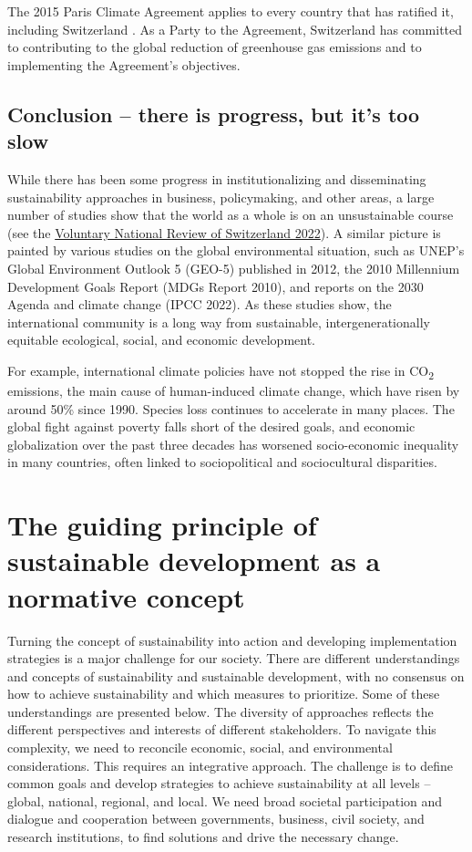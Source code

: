 \documentclass[
  a4paper,
  openany]{book}
\begin{document}
The 2015 Paris Climate Agreement applies to every country that has
ratified it, including Switzerland . As a Party to the Agreement,
Switzerland has committed to contributing to the global reduction of
greenhouse gas emissions and to implementing the Agreement's objectives.

\subsection{Conclusion -- there is progress, but it's too
slow}\label{conclusion-there-is-progress-but-its-too-slow}

While there has been some progress in institutionalizing and
disseminating sustainability approaches in business, policymaking, and
other areas, a large number of studies show that the world as a whole is
on an unsustainable course (see the
\href{https://www.sdgital2030.ch/countryreport}{Voluntary National
Review of Switzerland 2022}). A similar picture is painted by various
studies on the global environmental situation, such as UNEP's Global
Environment Outlook 5 (GEO-5) published in 2012, the 2010 Millennium
Development Goals Report (MDGs Report 2010), and reports on the 2030
Agenda and climate change (IPCC 2022). As these studies show, the
international community is a long way from sustainable,
intergenerationally equitable ecological, social, and economic
development.

For example, international climate policies have not stopped the rise in
CO\textsubscript{2} emissions, the main cause of human-induced climate
change, which have risen by around 50\% since 1990. Species loss
continues to accelerate in many places. The global fight against poverty
falls short of the desired goals, and economic globalization over the
past three decades has worsened socio-economic inequality in many
countries, often linked to sociopolitical and sociocultural disparities.

\section{The guiding principle of sustainable development as a normative
concept}\label{the-guiding-principle-of-sustainable-development-as-a-normative-concept}

Turning the concept of sustainability into action and developing
implementation strategies is a major challenge for our society. There
are different understandings and concepts of sustainability and
sustainable development, with no consensus on how to achieve
sustainability and which measures to prioritize. Some of these
understandings are presented below. The diversity of approaches reflects
the different perspectives and interests of different stakeholders. To
navigate this complexity, we need to reconcile economic, social, and
environmental considerations. This requires an integrative approach. The
challenge is to define common goals and develop strategies to achieve
sustainability at all levels -- global, national, regional, and local.
We need broad societal participation and dialogue and cooperation
between governments, business, civil society, and research institutions,
to find solutions and drive the necessary change.
\end{document}

